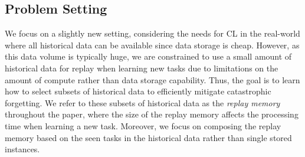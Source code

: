 
\subsection{Problem Setting}\label{paperC:sec:problem_setting}



We focus on a slightly new setting, considering the needs for CL in the real-world where all historical data can be available since data storage is cheap. However, as this data volume is typically huge, we are constrained to use a small amount of historical data for replay when learning new tasks due to limitations on the amount of compute rather than data storage capability. 
Thus, the goal is to learn how to select subsets of historical data to efficiently mitigate catastrophic forgetting. %
We refer to these subsets of historical data as the \textit{replay memory} throughout the paper, where the size of the replay memory affects the processing time when learning a new task. %
Moreover, we focus on composing the replay memory based on the seen tasks in the historical data rather than single stored instances. 

\setlength{\abovedisplayskip}{0pt}
\setlength{\belowdisplayskip}{0pt}
\setlength{\abovedisplayshortskip}{0pt}
\setlength{\belowdisplayshortskip}{0pt}


